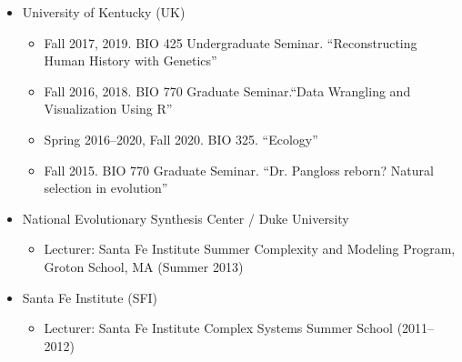 \documentclass[11pt]{article}
\begin{document}
  \begin{itemize}
  \item University of Kentucky (UK)
    \begin{itemize}
    \item Fall 2017, 2019. BIO 425 Undergraduate Seminar. ``Reconstructing Human History with Genetics''
    \item Fall 2016, 2018. BIO 770 Graduate Seminar.``Data Wrangling and Visualization Using R''
    \item Spring 2016--2020, Fall 2020. BIO 325. ``Ecology''
    \item Fall 2015. BIO 770 Graduate Seminar. ``Dr. Pangloss reborn? Natural selection in evolution''
    \end{itemize}
  \item National Evolutionary Synthesis Center / Duke University
    \begin{itemize}
    \item Lecturer: Santa Fe Institute Summer Complexity and Modeling Program, \\
      Groton School, MA (Summer 2013)
    \end{itemize}
  \item Santa Fe Institute (SFI)
    \begin{itemize}
    \item Lecturer: Santa Fe Institute Complex Systems Summer School (2011--2012)
    \end{itemize}
  \end{itemize}
  
\end{document}
